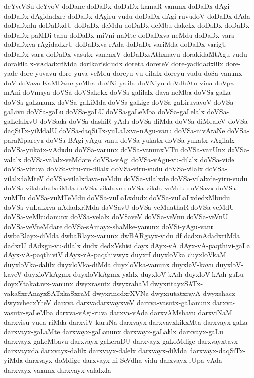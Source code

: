 {deYveVSu
deYvoV
doDane
doDaDx
doDaDx-kamaR-vanunx
doDaDx-dAgi
doDaDx-dAgidadxre
doDaDx-dAgiru-vudu
doDaDx-dAgi-ruvudoV
doDaDx-dAda
doDaDxdu
doDaDxdU
doDaDx-deMdu
doDaDx-deMbu-dakekx
doDaDx-doDaDx
doDaDx-paMDi-tanu
doDaDx-miVni-naMte
doDaDxva-neMdu
doDaDx-vara
doDaDxva-rAgidadxrU
doDaDxva-rAda
doDaDx-variMda
doDaDx-varigU
doDaDx-varu
doDaDx-vasutx-vanenxV
doDaDxsAthxnavu
dorakidaMtAgu-vudu
dorakilalx-vAdadxriMda
dorikarisidudx
doreta
doreteV
dore-yadidadxlilx
dore-yade
dore-yuvavu
dore-yuva-veMdu
doreyu-vu-dilalx
doreyu-vudu
doSa-vanunx
doV
doVava-KaMDane-yeMba
doVNi-yalilx
doVNiyu
doVdhAtu-vina
doVpa-mAni
doVmaya
doVSa
doVSakekx
doVSa-galilalx-dava-neMba
doVSa-gaLa
doVSa-gaLanunx
doVSa-gaLiMda
doVSa-gaLige
doVSa-gaLiruvavoV
doVSa-gaLivu
doVSa-gaLu
doVSa-gaLU
doVSa-gaLeMba
doVSa-gaLelalx
doVSa-gaLelalxvU
doVSada
doVSa-dashiR-yAda
doVSa-diMda
doVSa-diMdaleV
doVSa-daqSiTx-yiMdalU
doVSa-daqSiTx-yuLaLxva-nAgu-vanu
doVSa-nivAraNe
doVSa-paraMpareyu
doVSa-BAgi-yAgu-vanu
doVSa-yukatx
doVSa-yukatx-vAgilalx
doVSa-yukatx-vAdudu
doVSa-vanunx
doVSa-vanunxMTu
doVSa-vanUnx
doVSa-valalx
doVSa-valalx-veMdare
doVSa-vAgi
doVSa-vAgu-vu-dilalx
doVSa-vide
doVSa-viruva
doVSa-viru-vu-dilalx
doVSa-viru-vudu
doVSa-vilalx
doVSa-vilalxdaMteV
doVSa-vilalxdava-neMdu
doVSa-vilalxde
doVSa-vilalxde-yiru-vudu
doVSa-vilalxdadxriMda
doVSa-vilalxve
doVSa-vilalx-veMdu
doVSavu
doVSa-vuMTu
doVSa-vuMTeMdu
doVSa-vuLaLxdudx
doVSa-vuLaLxdedxMbudu
doVSa-vuLaLxva-nAdadxriMda
doVSavU
doVSa-veMdathaR
doVSa-veMdU
doVSa-veMbudanunx
doVSa-velalx
doVSaveV
doVSa-veVnu
doVSa-veVnU
doVSa-veVneMdare
doVSa-sAmayx-shaMke-yanunx
doVSi-yAgu-vanu
dwbaRlayx-diMda
dwbaRlayx-vanunx
dwBARgayx-vidu
df
dadxnAdadxriMda
dadxrU
dAdxgu-vu-dilalx
dudx
dedxVshisi
dayx
dAyx-vA
dAyx-vA-paqthivi-gaLa
dAyx-vA-paqthiviV
dAyx-vA-paqthivwyx
duyxtf
duyxloVka
duyxloVkaM
duyxloVka-dalilx
duyxloVka-diMda
duyxloVka-vanunx
duyxloV-kavu
duyxloV-kaveV
duyxloVkAginx
duyxloVkAginx-yalilx
duyxloV-kAdi
duyxloV-kAdi-gaLu
doyxVtakatavx-vanunx
dwyxrasutx
dwyxrahaM
dwyxritayxSATx-vakaSxrAnayxSATxkaSxraM
dwyxrinedxrXVNa
dwyxrutatxrayA
dwyxshacx
dwyxshecxYteV
darxva
darxvadarxvayxveV
darxva-vasutx-gaLanunx
darxva-vasutx-gaLeMba
darxva-vAgi-ruva
darxva-vAda
darxvAMshavu
darxviNaM
darxvisu-vuda-riMda
darxviV-karaNa
darxvayx
darxvayxkikxMta
darxvayx-gaLa
darxvayx-gaLaMte
darxvayx-gaLanunx
darxvayx-gaLalilx
darxvayx-gaLu
darxvayx-gaLeMbavu
darxvayx-gaLeraDU
darxvayx-gaLoMdige
darxvayxtavx
darxvayxda
darxvayx-dalilx
darxvayx-dalelx
darxvayx-diMda
darxvayx-daqSiTx-yiMda
darxvayx-doMdige
darxvayx-ni-SeVdha-vidu
darxvayx-rUpa-vAda
darxvayx-vanunx
darxvayx-valalxda
}
